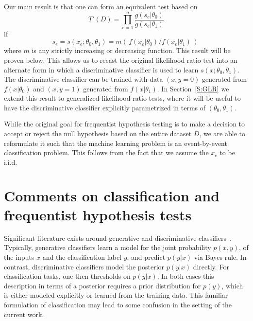 \documentclass[11pt, oneside]{article}   	%
\begin{document}
Our main result is that one can form an equivalent test based on 
\begin{equation}\label{eq:equivLRtest}
T'(D) = \prod_{e=1}^n \frac{ g(s_e | \theta_0)}{ g(s_e | \theta_1)}
\end{equation}
if 
\begin{equation}\label{eq:montonic}
s_e = s(x_e; \theta_0, \theta_1) = m\left(\, f(x_e|\theta_0) / f(x_e|\theta_1) \,\right) \; 
\end{equation}
where $m$ is any strictly increasing or decreasing function. This result will be proven below.
This allows us to recast the original likelihood ratio test into an alternate form in which a discriminative classifier is 
used to learn $s(x; \theta_0, \theta_1)$. The discriminative classifier can be trained with data $(x,y=0)$ generated 
from $f(x|\theta_0)$ and $(x,y=1)$ generated from $f(x|\theta_1)$. In Section~\ref{S:GLR} we extend this result to generalized likelihood ratio tests, where it will be useful to have the discriminative classifier explicitly parametrized in terms of $(\theta_0, \theta_1)$.

While the original goal for frequentist hypothesis testing is to make a decision to accept or reject the null hypothesis based on the entire dataset $D$, we are able to reformulate it such that the machine learning problem is an event-by-event classification problem. This follows from the fact that we assume the $x_e$ to be i.i.d.

\section{Comments on classification and frequentist hypothesis tests}

Significant literature exists around generative and discriminative classifiers~\citep{AndrewY.Ng}. Typically, generative classifiers learn a model for the joint probability $p(x,y)$, of the inputs $x$ and the classification label $y$, and predict $p(y|x)$ via Bayes rule. In contrast, discriminative classifiers model the posterior $p(y|x)$ directly. For classification tasks, one then thresholds on $p(y|x)$. In both cases this description in terms of a posterior requires a prior distribution for $p(y)$, which is either modeled explicitly or learned from the training data. 
This familiar formulation of classification may lead to some confusion in the setting of the current work. 
\end{document}
